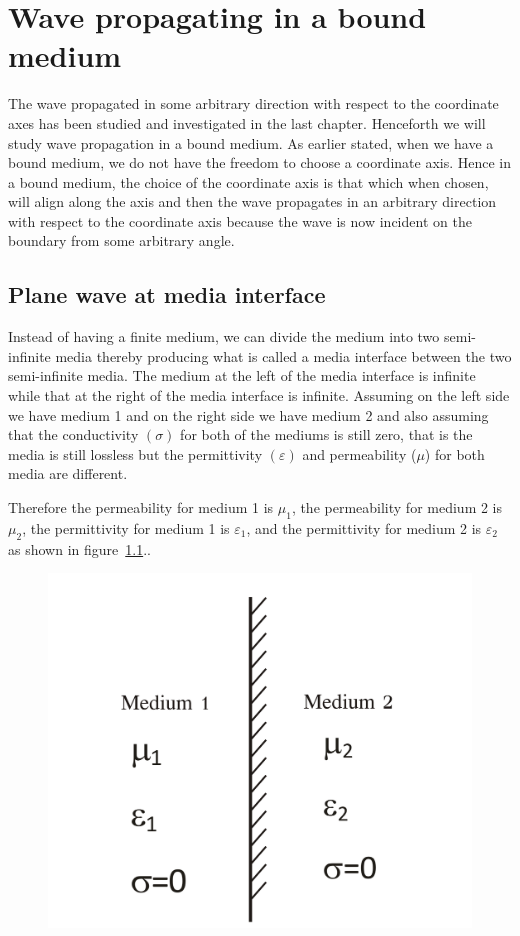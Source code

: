 \chapter{Wave propagating in a bound medium}\label{lec:lec30}
The wave propagated in some arbitrary direction with respect to the coordinate axes has been studied and investigated in the last chapter. Henceforth we will study wave propagation in a bound medium. As earlier stated, when we have a bound medium, we do not have the freedom to choose a coordinate axis. Hence in a bound medium, the choice of the coordinate axis is that which when chosen, will align along the axis and then the wave propagates in an arbitrary direction with respect to the coordinate axis because the wave is now incident on the boundary from some arbitrary angle.

\section{Plane wave at media interface}

Instead of having a finite medium, we can divide the medium into two semi-infinite media thereby producing what is called a media interface between the two semi-infinite media. The medium at the left of the media interface is infinite while that at the right of the media interface is infinite. Assuming on the left side we have medium 1 and on the right side we have medium 2 and also assuming that the conductivity $(\sigma)$ for both of the mediums is still zero, that is the media is still lossless but the permittivity $(\varepsilon)$ and permeability ($\mu$) for both media are different.

Therefore the permeability for medium 1 is $\mu_1$, the permeability for medium 2 is $\mu_2$, the permittivity for medium 1 is $\varepsilon_1$, and the permittivity for medium 2 is $\varepsilon_2$ as shown in figure~\ref{fig:group30a}..

\begin{figure}[h]
\centering
\includegraphics[width=.7\linewidth]{./graphics/group30a}
\caption{}
\label{fig:group30a}
\end{figure}


